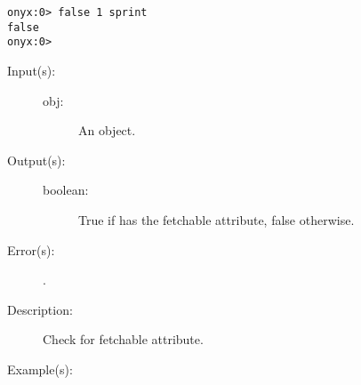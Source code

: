 \begin{description}
\begin{description}
\begin{verbatim}
onyx:0> false 1 sprint
false
onyx:0>
		\end{verbatim}
	\end{description}
\label{systemdict:fcheck}
\item[{\onyxop{obj}{fcheck}{boolean}}: ]
	\begin{description}\item[]
	\item[Input(s): ]
		\begin{description}\item[]
		\item[obj: ]
			An object.
		\end{description}
	\item[Output(s): ]
		\begin{description}\item[]
		\item[boolean: ]
			True if  has the fetchable attribute, false
			otherwise.
		\end{description}
	\item[Error(s): ]
		\begin{description}\item[]
		\item[.]
		\end{description}
	\item[Description: ]
		Check  for fetchable attribute.
	\item[Example(s): ]\begin{verbatim}


\end{verbatim}
\end{description}
\end{description}
